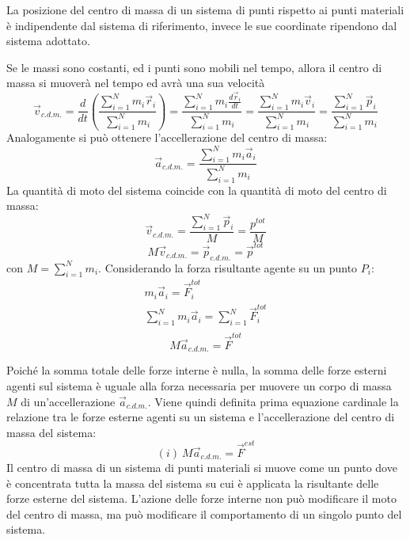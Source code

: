 \documentclass{article}
\numberwithin{equation}{subsection}
\begin{document}
La posizione del centro di massa di un sistema di punti rispetto ai punti materiali è indipendente dal sistema di riferimento, invece le sue coordinate ripendono dal sistema 
adottato. 



Se le massi sono costanti, ed i punti sono mobili nel tempo, 
allora il centro di massa si muoverà nel tempo ed avrà una sua velocità
\begin{equation}
    \vec{v}_{c.d.m.}=\frac{d}{dt}\left(\displaystyle\frac{\sum_{i=1}^{N}m_i\vec{r}_i}{\sum_{i=1}^{N}m_i}\right)=\displaystyle\frac{\sum_{i=1}^{N}m_i\frac{d\vec{r}_i}{dt}}{\sum_{i=1}^{N}m_i}=\displaystyle\frac{\sum_{i=1}^{N}m_i\vec{v}_i}{\sum_{i=1}^{N}m_i}=\displaystyle\frac{\sum_{i=1}^{N}\vec{p}_i}{\sum_{i=1}^{N}m_i}
\end{equation}
Analogamente si può ottenere l'accellerazione del centro di 
massa:
\begin{equation}
    \vec{a}_{c.d.m.}=\displaystyle\frac{\sum_{i=1}^{N}m_i\vec{a}_i}{\sum_{i=1}^{N}m_i}
\end{equation}
La quantità di moto del sistema coincide con la quantità di 
moto del centro di massa: 
\begin{equation*}
    \vec{v}_{c.d.m.}=\displaystyle\frac{\sum_{i=1}^{N}\vec{p}_i}{M}=\displaystyle\frac{p^{tot}}{M}
\end{equation*}
\begin{equation}
    M\vec{v}_{c.d.m.}=\vec{p}_{c.d.m.}=\vec{p}^{tot}
\end{equation}
con $M=\displaystyle\sum_{i=1}^{N}m_i$. 
Considerando la forza risultante agente su un punto $P_i$:
\begin{gather*}
    m_i\vec{a}_i=\vec{F}_i^{tot}\\
    \displaystyle\sum_{i=1}^{N}m_i\vec{a}_i=\sum_{i=1}^{N}\vec{F}_i^{tot}\\
\end{gather*}
\begin{equation}
    M\vec{a}_{c.d.m.}=\vec{F}^{tot}
\end{equation}


Poiché la somma totale delle forze interne è nulla, la somma 
delle forze esterni agenti sul 
sistema è uguale alla forza necessaria per muovere un corpo 
di massa $M$ di un'accellerazione $\vec{a}_{c.d.m.}$.
Viene quindi definita prima equazione cardinale la relazione tra le forze esterne agenti su un sistema e l'accellerazione del centro di massa del sistema: 
\begin{equation*}
    (i)\:M\vec{a}_{c.d.m.}=\vec{F}^{est}
\end{equation*}
Il centro di massa di un sistema di punti materiali si muove come un punto dove è concentrata tutta la massa del sistema su cui è applicata la risultante delle forze 
esterne del sistema. L'azione delle forze interne non può modificare il moto del centro di massa, ma può modificare il comportamento di un singolo punto del sistema. 
\end{document}
